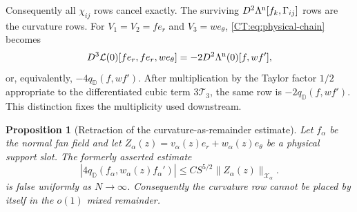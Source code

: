 \documentclass[11pt]{amsart}
\numberwithin{equation}{section}
\newtheorem{proposition}[theorem]{Proposition}
\theoremstyle{definition}
\theoremstyle{remark}
\newcommand{\qD}{q_{\mathbb D}}
\newcommand{\X}{\mathcal X}
\begin{document}
Consequently all $\chi_{ij}$ rows cancel exactly.  The surviving
$D^2\Lambda^{\rm n}[f_k,\Gamma_{ij}]$ rows are the curvature rows.  For
$V_1=V_2=fe_r$ and $V_3=we_\theta$, \eqref{CT:eq:physical-chain} becomes
\begin{equation}\label{CT:eq:tangent-special}
 D^3\mathcal L(0)[fe_r,fe_r,we_\theta]
 =-2D^2\Lambda^{\rm n}(0)[f,wf'],
\end{equation}
or, equivalently, $-4\qD(f,wf')$.  After multiplication by the Taylor
factor $1/2$ appropriate to the differentiated cubic term
$3\mathcal T_3$, the same row is $-2\qD(f,wf')$.  This distinction fixes
the multiplicity used downstream.

\begin{proposition}[Retraction of the curvature-as-remainder estimate]
\label{CT:prop:curvature-counterexample}
Let $f_\alpha$ be the normal fan field and let
$Z_\alpha(z)=v_\alpha(z)e_r+w_\alpha(z)e_\theta$ be a physical support
slot.  The formerly asserted estimate
\begin{equation}\label{CT:eq:curvature-absolute}
 \left|4\qD(f_\alpha,w_\alpha(z)f_\alpha')\right|
 \le CS^{5/2}\|Z_\alpha(z)\|_{\X_\alpha}.
\end{equation}
is false uniformly as $N\to\infty$.  Consequently the curvature row cannot
be placed by itself in the $o(1)$ mixed remainder.
\end{proposition}
\end{document}
